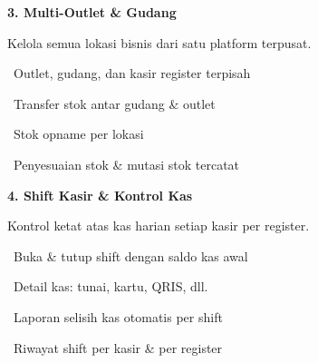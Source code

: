 \documentclass[a4paper]{article}
\begin{document}
\vspace{8pt}

\noindent
\begin{minipage}[t]{0.485\textwidth}
    \colorbox{BluePrimary}{%
        \begin{minipage}{\dimexpr\textwidth-2\fboxsep\relax}
            {\fontsize{10}{13}\selectfont\bfseries\color{White} 3. Multi-Outlet \& Gudang}
        \end{minipage}}\par
    \vspace{4pt}
    {\fontsize{9}{12}\selectfont\color{TextDark}%
    Kelola semua lokasi bisnis dari satu platform terpusat.\par\vspace{3pt}
    \textbullet\ Outlet, gudang, dan kasir register terpisah\par\vspace{2pt}%
    \textbullet\ Transfer stok antar gudang \& outlet\par\vspace{2pt}%
    \textbullet\ Stok opname per lokasi\par\vspace{2pt}%
    \textbullet\ Penyesuaian stok \& mutasi stok tercatat}%
\end{minipage}%
\hfill
\begin{minipage}[t]{0.485\textwidth}
    \colorbox{PurplePrimary}{%
        \begin{minipage}{\dimexpr\textwidth-2\fboxsep\relax}
            {\fontsize{10}{13}\selectfont\bfseries\color{White} 4. Shift Kasir \& Kontrol Kas}
        \end{minipage}}\par
    \vspace{4pt}
    {\fontsize{9}{12}\selectfont\color{TextDark}%
    Kontrol ketat atas kas harian setiap kasir per register.\par\vspace{3pt}
    \textbullet\ Buka \& tutup shift dengan saldo kas awal\par\vspace{2pt}%
    \textbullet\ Detail kas: tunai, kartu, QRIS, dll.\par\vspace{2pt}%
    \textbullet\ Laporan selisih kas otomatis per shift\par\vspace{2pt}%
    \textbullet\ Riwayat shift per kasir \& per register}%
\end{minipage}
\end{document}
